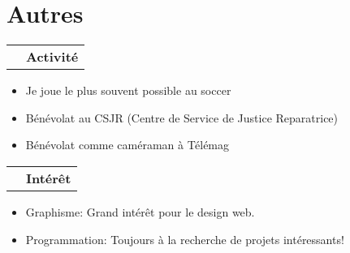 \documentclass[a4paper,9pt]{extarticle}
\makeatletter
\newlength{\indicewidth}%
\newlength{\separatorcolumnwidth}%
\newlength{\maincolumnwidth}%
\newcommand{\indicestyle}[1]{\slshape\textcolor{color0}{#1}}
\def\middleline{
\raisebox{0.35em}{\line(1,0){50}}
}
\renewcommand{\subsection}[1]{
\par\addvspace{3ex}
\begin{tabular}{@{}p{\indicewidth}@{\hspace{\separatorcolumnwidth}}p{\maincolumnwidth}@{}}%
    \raggedleft\indicestyle{}\middleline & { \strut\bfseries {#1} }%
    \par
\end{tabular}%
\vspace{-0.5em}
}
\makeatother
\begin{document}
\section{Autres}
\subsection{Activité}
\begin{itemize}

\item Je joue le plus souvent possible au soccer
\item Bénévolat au CSJR (Centre de Service de Justice Reparatrice)
\item Bénévolat comme caméraman à Télémag
\end{itemize}
\subsection{Intérêt}
\begin{itemize}
\item Graphisme: Grand intérêt pour le design web.
\item Programmation: Toujours à la recherche de projets intéressants!
\end{itemize}
\end{document}
